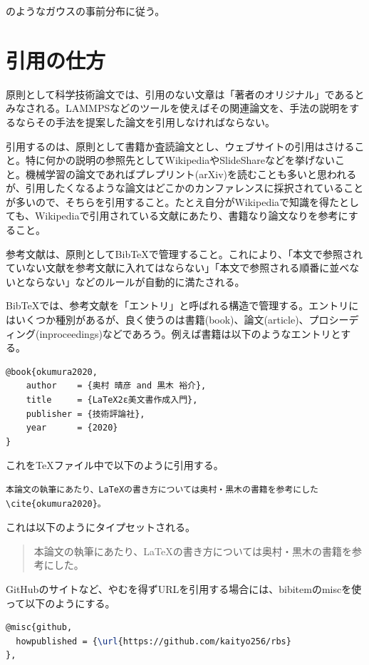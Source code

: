 \documentclass[titlepage]{jsreport}
\begin{document}
のようなガウスの事前分布に従う。


\section{引用の仕方}

原則として科学技術論文では、引用のない文章は「著者のオリジナル」であるとみなされる。LAMMPSなどのツールを使えばその関連論文を、手法の説明をするならその手法を提案した論文を引用しなければならない。

引用するのは、原則として書籍か査読論文とし、ウェブサイトの引用はさけること。特に何かの説明の参照先としてWikipediaやSlideShareなどを挙げないこと。機械学習の論文であればプレプリント(arXiv)を読むことも多いと思われるが、引用したくなるような論文はどこかのカンファレンスに採択されていることが多いので、そちらを引用すること。たとえ自分がWikipediaで知識を得たとしても、Wikipediaで引用されている文献にあたり、書籍なり論文なりを参考にすること。

参考文献は、原則としてBibTeXで管理すること。これにより、「本文で参照されていない文献を参考文献に入れてはならない」「本文で参照される順番に並べないとならない」などのルールが自動的に満たされる。

BibTeXでは、参考文献を「エントリ」と呼ばれる構造で管理する。エントリにはいくつか種別があるが、良く使うのは書籍(book)、論文(article)、プロシーディング(inproceedings)などであろう。例えば書籍は以下のようなエントリとする。

\begin{lstlisting}[language=TeX]
@book{okumura2020,
    author    = {奥村 晴彦 and 黒木 裕介},
    title     = {LaTeX2ε美文書作成入門},
    publisher = {技術評論社},
    year      = {2020}
}
\end{lstlisting}

これをTeXファイル中で以下のように引用する。

\begin{verbatim}
本論文の執筆にあたり、LaTeXの書き方については奥村・黒木の書籍を参考にした\cite{okumura2020}。
\end{verbatim}

これは以下のようにタイプセットされる。
\begin{quotation}
    本論文の執筆にあたり、LaTeXの書き方については奥村・黒木の書籍を参考にした\cite{okumura2020}。
\end{quotation}


GitHubのサイトなど、やむを得ずURLを引用する場合には、bibitemのmiscを使って以下のようにする。

\begin{lstlisting}[language=TeX]
@misc{github,
  howpublished = {\url{https://github.com/kaityo256/rbs}
},
\end{lstlisting}
\end{document}
